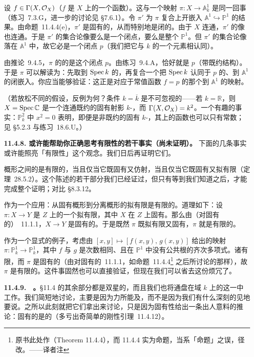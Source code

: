 设 $f\in\Gamma(X,\mathcal{O}_X)$（$f$ 是 $X$ 上的一个函数）。这与一个映射 $\pi\colon X\to\mathbb{A}^1_k$ 是同一回事（\mbox{练习~7.3.G}，进一步的讨论见 \S7.6.1）。令 $\pi'$ 为 $\pi$ 复合上开嵌入 $\mathbb{A}^1\hookrightarrow\mathbb{P}^1$ 的结果。由命题~11.4.4(e)，$\pi'$ 是固有的，从而特别地是闭的。由于 $X$ 连通，$\pi'$ 的像也连通。于是 $\pi'$ 的集合论像要么是一个闭点，要么是整个 $\mathbb{P}^1$。但 $\pi'$ 的集合论像落在 $\mathbb{A}^1$ 中，故它必是一个闭点 $p$（我们把它与 $k$ 的一个元素相认同）。

由推论~9.4.5，$\pi$ 的\trSchemeTheoreticImage{}的\trSupport{}是这个闭点 $p$。由\mbox{练习~9.4.A}，\trSchemeTheoreticImage{}恰好就是 $p$（带既约结构）。于是 $\pi$ 可以解读为：先取到 $\operatorname{Spec} k$ 的\trStructureMorphism，再复合一个把 $\operatorname{Spec} k$ 认同于 $p$ 的、到 $\mathbb{A}^1$ 的闭嵌入。你应当能够验证：这正是对应于常值函数 $f=p$ 的那个到 $\mathbb{A}^1$ 的映射。

（若放松不同的假设，反例为何？条件 $k=\overline{k}$ 是不可忽视的——若 $k=\mathbb{R}$，则 $X=\operatorname{Spec}\mathbb{C}$ 是一个连通既约的固有射影 $k$-\trScheme，而 $\Gamma(X,\mathcal{O}_X)=k^2$。一个有趣的事实：$\mathbb{P}^2_k$ 中 $x^2=0$ 表明，即便是非既约的固有 $k$-\trScheme，其上的函数也可以只有常数；见 \S5.2.3 与\mbox{练习~18.6.U}。）

\textbf{11.4.8. 或许能帮助你正确思考有限性的若干事实（尚未证明）。}\quad
下面的几条事实或许能照亮「有限性」这个观念。我们日后再证明它们。

\trLocally\trNoetherian{}概形之间的\trMorphism{}是有限的，当且仅当它既固有又仿射，当且仅当它既固有又拟有限（定理~28.5.2）。这个陈述的若干部分我们已经证过，但只有等到我们知道\trZariskiMainTheorem{}之后，才能完成整个证明；对比 \S8.3.12。

作为一个应用：从固有概形到分离概形的拟有限\trMorphism{}是有限的。道理如下：设 $\pi\colon X\to Y$ 是 $Z$ 上的一个拟有限\trMorphism，其中 $X$ 在 $Z$ 上固有。那么由（对固有\trMorphism{}的）\trCancellationTheorem~11.1.1，$X\to Y$ 是固有的。于是既然 $\pi$ 既拟有限又固有，$\pi$ 就是有限的。

作为一个显式的例子，考虑由 $[x,y]\mapsto[f(x,y),\,g(x,y)]$ 给出的映射 $\pi\colon\mathbb{P}^1_k\to\mathbb{P}^1_k$，其中 $f$ 与 $g$ 是次数相同、且在 $\mathbb{P}^1$ 中没有公共根的齐次多项式。诸\trFiber{}有限，而 $\pi$ 是固有的（由对固有\trMorphism{}的\trCancellationTheorem~11.1.1，如命题~11.4.4\footnote{原书此处作（Theorem 11.4.4），而 11.4.4 实为命题，当系「命题」之误，径改。——译者注} 之后所讨论的那样），故 $\pi$ 是有限的。这件事固然也可以直接验证，但现在我们可以省去这份烦冗了。

\textbf{11.4.9.}\ \extrahard\ \textbf{\trGroupVariety{}。}\quad \S11.4 的其余部分都是双星的，而且我们也将通盘在域 $k$ 上的\emph{\trVariety}这一\trCategory{}中工作。我们简短地讨论\trGroupVariety{}，主要是因为力所能及，而不是因为我们有什么深刻的见地要说。之所以此刻就把它们拿出来讨论，只是因为固有性给出一条出人意料的推论：固有的\trGroupVariety{}是\trAbelian{}的（多亏出奇简单的刚性引理~11.4.12）。

